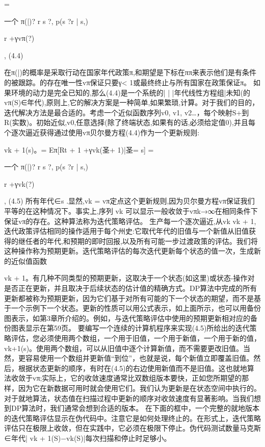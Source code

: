 =

一个
π(|)?
r s ?,
p(s ?r | s,)

r +γvπ(?)

, 					(4.4)


在π(|)的概率是采取行动在国家年代政策π,和期望是下标在ππ来表示他们是有条件的被跟踪。的存在唯一性vπ保证只要γ< 1或最终终止与所有国家在政策保证π。
如果环境的动力是完全已知的,那么(4.4)是一个系统的| | |年代线性方程组|未知(的vπ(S)∈年代),原则上,它的解决方案是一种简单,如果繁琐,计算。对于我们的目的，迭代解决方法是最合适的。考虑一个近似函数序列v0, v1, v2…，每个映射S+到R(实数)。初始近似,v0,任意选择(除了终端状态,如果有的话,必须给定值0),并且每个逐次逼近获得通过使用vπ贝尔曼方程(4.4)作为一个更新规则:

vk + 1(s)。= Eπ[Rt + 1 +γvk(圣+ 1)|圣= s]
=

一个
π(|)?
r s ?,
p(s ?r | s,)

r +γvk(?)

, 					(4.5)
所有年代∈s .显然,vk = vπ定点这个更新规则,因为贝尔曼方程vπ保证我们平等的在这种情况下。事实上,序列{ vk }可以显示一般收敛于vπk→∞在相同条件下保证vπ的存在。这种算法称为迭代策略评估。
生产每一个逐次逼近,从vk vk + 1,迭代政策评估相同的操作适用于每个州史:它取代年代的旧值与一个新值从旧值获得的继任者的年代,和预期的即时回报,以及所有可能一步过渡政策的评估。我们将这种操作称为预期更新。迭代策略评估的每次迭代更新每个状态的值一次，生成新的近似值函数

vk + 1。有几种不同类型的预期更新，这取决于一个状态(如这里)或状态-操作对是否正在更新，并且取决于后续状态的估计值的精确方式。DP算法中完成的所有更新都被称为预期更新，因为它们基于对所有可能的下一个状态的期望，而不是基于一个示例下一个状态。更新的性质可以用公式表示，如上面所示，也可以用备份图表示，如第3章所介绍的。例如，与迭代策略评估中使用的预期更新相对应的备份图表显示在第59页。
要编写一个连续的计算机程序来实现(4.5)所给出的迭代策略评估，您必须使用两个数组，一个用于旧值，一个用于新值，一个用于新的值，vk+1(s)。使用两个数组，可以从旧值中逐个计算新值，而不需要更改旧值。当然，更容易使用一个数组并更新值“到位”，也就是说，每个新值立即覆盖旧值。然后，根据状态更新的顺序，有时在(4.5)的右边使用新值而不是旧值。这也就地算法收敛于vπ;实际上，它的收敛速度通常比双数组版本要快，正如您所期望的那样，因为它在新数据可用时就会使用它们。我们认为更新是在状态空间中执行的。对于就地算法，状态值在扫描过程中更新的顺序对收敛速度有显著影响。当我们想到DP算法时，我们通常会想到合适的版本。
在下面的框中，一个完整的就地版本的迭代策略评估显示在伪代码中。注意它是如何处理终止的。在形式上，迭代策略评估只在极限上收敛，但在实践中，它必须在极限下停止。伪代码测试数量马克斯∈年代| vk + 1(S)−vk(S)|每次扫描和停止时足够小。


